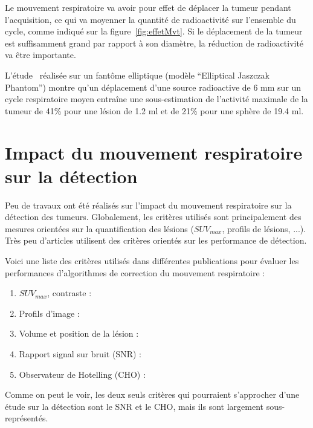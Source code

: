 Le mouvement respiratoire va avoir pour effet de déplacer la tumeur pendant l'acquisition, ce qui va moyenner la quantité de radioactivité sur l'ensemble du cycle, comme indiqué sur la figure~\ref{fig:effetMvt}. Si le déplacement de la tumeur est suffisamment grand par rapport à son diamètre, la réduction de radioactivité va être importante.

L'étude~\cite{boucher2004respiratory} réalisée sur un fantôme elliptique (modèle ``Elliptical Jaszczak Phantom'') montre qu'un déplacement d'une source radioactive de 6 mm sur un cycle respiratoire moyen entraîne une sous-estimation de l'activité maximale de la tumeur de 41\% pour une lésion de 1.2 ml et de 21\% pour une sphère de 19.4 ml.


\section{Impact du mouvement respiratoire sur la détection}

Peu de travaux ont été réalisés sur l'impact du mouvement respiratoire sur la détection des tumeurs. Globalement, les critères utilisés sont principalement des mesures orientées sur la quantification des lésions ($SUV_{max}$, profils de lésions, ...). Très peu d'articles utilisent des critères orientés sur les performance de détection.

Voici une liste des critères utilisés dans différentes publications pour évaluer les performances d'algorithmes de correction du mouvement respiratoire :

\begin{enumerate}
 \item  $SUV_{max}$, contraste :~\cite{GuopingChang2010Implementation,lamare2007list,nehmeh2002effect,detorie2008quantitative}
 \item Profils d'image :~\cite{GuopingChang2010Implementation,Thielemans2006Lesion,lamare2007list}
 \item Volume et position de la lésion :~\cite{GuopingChang2010Implementation,lamare2007list,nehmeh2002effect}
 \item Rapport signal sur bruit (SNR) :~\cite{GuopingChang2010Implementation}
 \item Observateur de Hotelling (CHO) :~\cite{Thielemans2006Lesion}
\end{enumerate}

Comme on peut le voir, les deux seuls critères qui pourraient s'approcher d'une étude sur la détection sont le SNR et le CHO, mais ils sont largement sous-représentés. 

